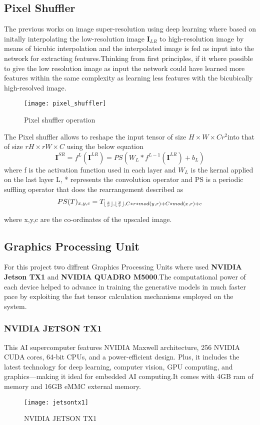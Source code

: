 \subsection{Pixel Shuffler}
The previous works on image super-resolution using deep learning  where based on initally interpolating the low-resolution image $\textbf{I}_{LR}$ to high-resolution image by means of bicubic interpolation and the interpolated image is fed as input into the network for extracting features.Thinking from first principles, if it where possible to give the low resolution image as input the network could have learned more features within the same complexity as learning less features with the bicubically high-resolved image.
\begin{figure}[h!]
 \centering
 \texttt{[image: pixel\_shuffler]}
 \caption{Pixel shuffler operation}
 \label{fig:pixelshuffler}
\end{figure}

The Pixel shuffler allows to reshape the input tensor of size $ H \times W \times Cr^2 $into that of size $rH \times rW \times C$ using the below equation
\begin{equation}
\textbf{I}^{SR} = f^L(\textbf{I}^{LR}) = PS(W_L * f^{L-1}(\textbf{I}^{LR}) + b_L)
\end{equation}
where f is the activation function used in each layer and $W_L$ is the kernal applied on the last layer L, * represents the convolution operator and  PS is a periodic suffling operator that does the rearrangement described as
\begin{equation}
PS(T)_{x,y,c} = T_{\lfloor\frac{x}{r}\rfloor,\lfloor\frac{y}{r}\rfloor,C*r*mod(y,r) + C*mod(x,r)+c}
\end{equation}

where x,y,c are the co-ordinates of the upscaled image.
\subsection{Graphics Processing Unit}
For this project two diffrent Graphics Processing Units where used \textbf{NVIDIA Jetson TX1} and \textbf{NVIDIA QUADRO M5000}.The computational power of each device helped to advance in training the generative models in much faster pace by exploiting the fast tensor calculation mechanisms employed on the system.

\subsubsection{NVIDIA JETSON TX1}
This AI supercomputer features NVIDIA Maxwell architecture, 256 NVIDIA CUDA cores, 64-bit CPUs, and a power-efficient design. Plus, it includes the latest technology for deep learning, computer vision, GPU computing, and graphics—making it ideal for embedded AI computing.It comes with 4GB ram of memory and 16GB eMMC external memory.
\begin{figure}[h!]
 \centering
 \texttt{[image: jetsontx1]}
 \caption{NVIDIA JETSON TX1}
 \label{fig:jetson}
\end{figure}
